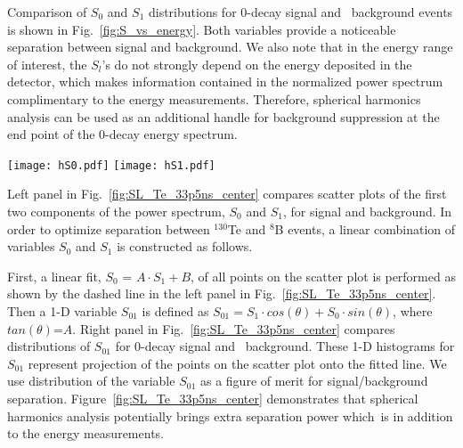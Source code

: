 Comparison of $S_0$ and $S_1$ distributions for 0\nbb-decay signal and \B~background events is shown in Fig.~\ref{fig:S_vs_energy}.
Both variables provide a noticeable separation between signal and background. We also note that in the energy range of interest, 
the $S_l$'s do not strongly depend on the energy deposited in the detector, which makes information contained in the normalized power 
spectrum complimentary to the energy measurements. Therefore, spherical harmonics analysis can be used as an additional handle for
background suppression at the end point of the 0\nbb-decay energy spectrum.

\begin{figure*}[h]
\centering
\texttt{[image: hS0.pdf]}
\texttt{[image: hS1.pdf]}
\caption{$S_0$ (\emph{left}) and $S_1$ (\emph{right}) distributions for 1000 simulated 0\nbb-decay signal and \B~background events.
  Two different isotopes are compared, $^{130}$Te and $^{82}$Se. Corresponding kinetic energies of \B~single electrons are
  2.53 MeV and 3.00 MeV. Central events assuming perfect reconstruction of vertex position. Time cut of 33.5~ns on the PE arrival time is
  applied. The default QE and 100\% photo-coverage is used in the simulation.}
\label{fig:S_vs_energy}
\end{figure*}

Left panel in Fig.~\ref{fig:SL_Te_33p5ns_center} compares scatter plots of the first two components of the power spectrum, 
$S_0$ and $S_1$, for signal and background. In order to optimize separation between $^{130}$Te and $^{8}$B
events, a linear combination of variables $S_0$ and $S_1$ is constructed as follows. 

First, a linear fit, $S_0$ = $A \cdot S_1 + B$, of all points on the scatter plot is performed as shown by the dashed 
line in the left panel in Fig.~\ref{fig:SL_Te_33p5ns_center}. Then a 1-D variable $S_{01}$ is defined as
$S_{01} = S_1 \cdot cos(\theta) + S_0 \cdot sin(\theta)$, where $tan(\theta)$=$A$. Right panel in Fig.~\ref{fig:SL_Te_33p5ns_center}
compares distributions of $S_{01}$ for 0\nbb-decay signal and \B~background. These 1-D histograms for $S_{01}$ represent
projection of the points on the scatter plot onto the fitted line. We use distribution of the variable $S_{01}$ as a figure of merit
for signal/background separation. Figure~\ref{fig:SL_Te_33p5ns_center} demonstrates that spherical harmonics analysis potentially 
brings extra separation power which\ is in addition to the energy measurements.


